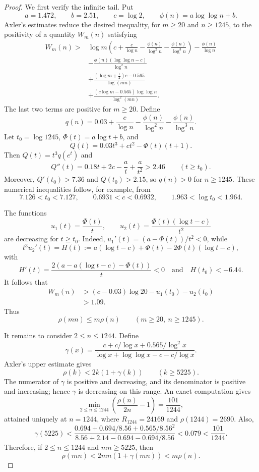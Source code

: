 \documentclass[11pt]{amsart}
\begin{document}
\begin{proof}
We first verify the infinite tail.  Put
\[
 a=1.472,\qquad b=2.51,\qquad c=\log2,
 \qquad \phi(n)=a\log\log n+b.
\]
Axler's estimates \cite[(5.5) and (5.9)]{Axler17} reduce the desired
inequality, for $m\geq20$ and $n\geq1245$, to the positivity of a
quantity $W_m(n)$ satisfying
\begin{align*}
W_m(n)>{}&\log m\left(c+\frac{c}{\log n}
 -\frac{\phi(n)}{\log^2n}-\frac{\phi(n)}{\log^3n}\right)
 -\frac{\phi(n)}{\log n}\\
&-\frac{\phi(n)(\log\log n-c)}{\log^2n}\\
&+\frac{(\log m+\tfrac12)c-0.565}{\log(mn)}\\
&+\frac{(c\log m-0.565)\log\log n}{\log^2(mn)}.
\end{align*}
The last two terms are positive for $m\geq20$.  Define
\[
 q(n)=0.03+\frac{c}{\log n}
      -\frac{\phi(n)}{\log^2n}-\frac{\phi(n)}{\log^3n}.
\]
Let $t_0=\log1245$, $\Phi(t)=a\log t+b$, and
\[
 Q(t)=0.03t^3+ct^2-\Phi(t)(t+1).
\]
Then $Q(t)=t^3q(e^t)$ and
\[
 Q''(t)=0.18t+2c-\frac{a}{t}+\frac{a}{t^2}>2.46
 \qquad(t\geq t_0).
\]
Moreover, $Q'(t_0)>7.36$ and $Q(t_0)>2.15$, so $q(n)>0$ for
$n\geq1245$.  These numerical inequalities follow, for example, from
\[
 7.126<t_0<7.127,\qquad
 0.6931<c<0.6932,\qquad
 1.963<\log t_0<1.964.
\]

The functions
\[
 u_1(t)=\frac{\Phi(t)}{t},
 \qquad
 u_2(t)=\frac{\Phi(t)(\log t-c)}{t^2}
\]
are decreasing for $t\geq t_0$.  Indeed,
$u_1'(t)=(a-\Phi(t))/t^2<0$, while
\[
 t^3u_2'(t)=H(t):=a(\log t-c)+\Phi(t)
                    -2\Phi(t)(\log t-c),
\]
with
\[
 H'(t)=\frac{2(a-a(\log t-c)-\Phi(t))}{t}<0
 \quad\text{and}\quad H(t_0)<-6.44.
\]
It follows that
\begin{align*}
 W_m(n)
 &>(c-0.03)\log20-u_1(t_0)-u_2(t_0)\\
 &>1.09.
\end{align*}
Thus
\begin{equation}\label{eq:tail}
 \rho(mn)\leq m\rho(n)
 \qquad(m\geq20,\ n\geq1245).
\end{equation}

It remains to consider $2\leq n\leq1244$.  Define
\[
 \gamma(x)=
 \frac{c+c/\log x+0.565/\log^2x}
      {\log x+\log\log x-c-c/\log x}.
\]
Axler's upper estimate \cite[Theorem~1.2 and (3.4)--(3.5)]{Axler17}
gives
\begin{equation}\label{eq:upper}
 \rho(k)<2k(1+\gamma(k)) \qquad(k\geq5225).
\end{equation}
The numerator of $\gamma$ is positive and decreasing, and its denominator
is positive and increasing; hence $\gamma$ is decreasing on this range.
An exact computation gives
\begin{equation}\label{eq:epsilon}
 \min_{2\leq n\leq1244}
 \left(\frac{\rho(n)}{2n}-1\right)
 =\frac{101}{1244},
\end{equation}
attained uniquely at $n=1244$, where
$R_{1244}=24169$ and $\rho(1244)=2690$.  Also,
\[
 \gamma(5225)
 <\frac{0.694+0.694/8.56+0.565/8.56^2}
         {8.56+2.14-0.694-0.694/8.56}
 <0.079<\frac{101}{1244}.
\]
Therefore, if $2\leq n\leq1244$ and $mn\geq5225$, then
\[
 \rho(mn)
 <2mn(1+\gamma(mn))
 <m\rho(n).
\]


\end{proof}
\end{document}
